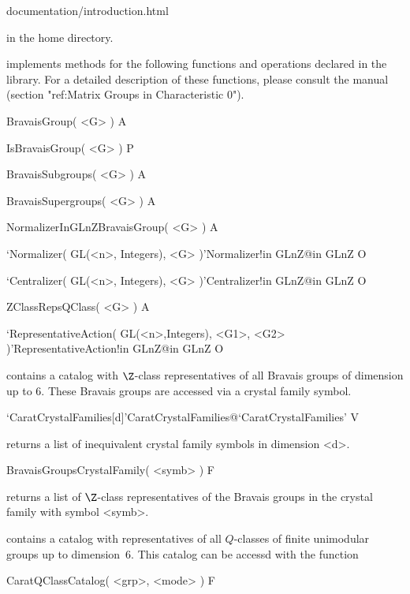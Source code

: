 \beginexample
    documentation/introduction.html
\endexample

in the {\CARAT} home directory.



{\CARAT} implements methods for the following functions and operations
declared in the {\GAP} library. For a detailed description of these
functions, please consult the {\GAP} manual (section 
"ref:Matrix Groups in Characteristic 0").

\>BravaisGroup( <G> ) A

\>IsBravaisGroup( <G> ) P

\>BravaisSubgroups( <G> ) A

\>BravaisSupergroups( <G> ) A

\>NormalizerInGLnZBravaisGroup( <G> ) A

\>`Normalizer( GL(<n>, Integers), <G> )'{Normalizer!in GLnZ}@{in GLnZ} O

\>`Centralizer( GL(<n>, Integers), <G> )'{Centralizer!in GLnZ}@{in GLnZ} O

\>ZClassRepsQClass( <G> ) A

\>`RepresentativeAction( GL(<n>,Integers), <G1>, <G2> )'{RepresentativeAction!in GLnZ}@{in GLnZ} O



{\CARAT} contains a catalog with $\Z$-class representatives of all
Bravais groups of dimension up to 6. These Bravais groups are
accessed via a crystal family symbol.

\>`CaratCrystalFamilies[d]'{CaratCrystalFamilies}@{`CaratCrystalFamilies'} V

returns a list of inequivalent crystal family symbols in dimension <d>.

\>BravaisGroupsCrystalFamily( <symb> ) F

returns a list of $\Z$-class representatives of the Bravais groups
in the crystal family with symbol <symb>.


{\CARAT} contains a catalog with representatives of all $Q$-classes of
finite unimodular groups up to dimension~6. This catalog can be accessd
with the function

\>CaratQClassCatalog( <grp>, <mode> ) F

